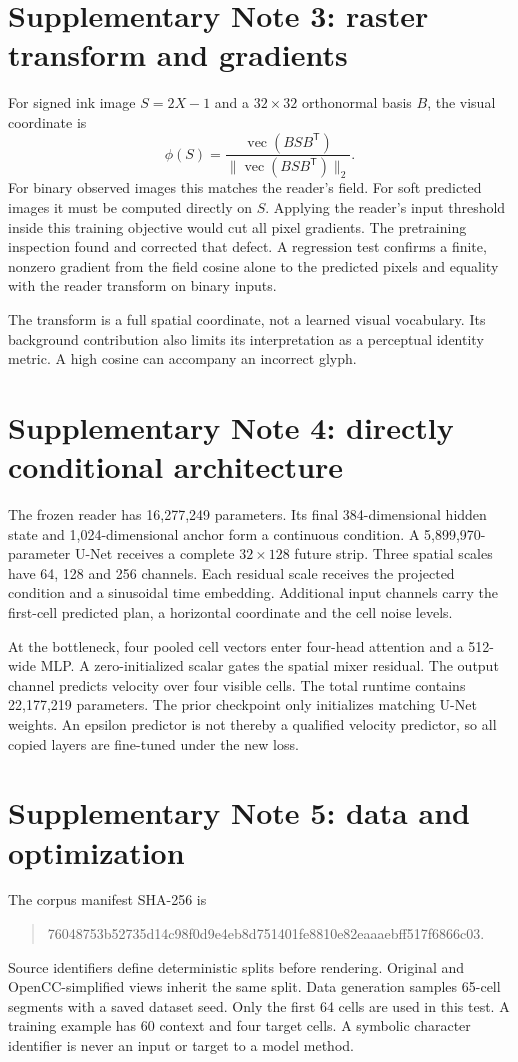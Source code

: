 \documentclass[10pt,a4paper]{article}
\begin{document}
\section*{Supplementary Note 3: raster transform and gradients}
For signed ink image $S=2X-1$ and a $32\times32$ orthonormal basis $B$, the
visual coordinate is
\begin{equation}
\phi(S)=\frac{\operatorname{vec}(BSB^{\mathsf T})}
{\|\operatorname{vec}(BSB^{\mathsf T})\|_2}.
\end{equation}
For binary observed images this matches the reader's field. For soft predicted
images it must be computed directly on $S$. Applying the reader's input
threshold inside this training objective would cut all pixel gradients.
The pretraining inspection found and corrected that defect. A regression test
confirms a finite, nonzero gradient from the field cosine alone to the predicted
pixels and equality with the reader transform on binary inputs.

The transform is a full spatial coordinate, not a learned visual vocabulary.
Its background contribution also limits its interpretation as a perceptual
identity metric. A high cosine can accompany an incorrect glyph.

\section*{Supplementary Note 4: directly conditional architecture}
The frozen reader has 16,277,249 parameters. Its final 384-dimensional hidden
state and 1,024-dimensional anchor form a continuous condition. A 5,899,970-
parameter U-Net receives a complete $32\times128$ future strip. Three spatial
scales have 64, 128 and 256 channels. Each residual scale receives the projected
condition and a sinusoidal time embedding. Additional input channels carry the
first-cell predicted plan, a horizontal coordinate and the cell noise levels.

At the bottleneck, four pooled cell vectors enter four-head attention and a
512-wide MLP. A zero-initialized scalar gates the spatial mixer residual.
The output channel predicts velocity over four visible cells. The total
runtime contains 22,177,219 parameters. The prior checkpoint only initializes
matching U-Net weights. An epsilon predictor is not thereby a qualified
velocity predictor, so all copied layers are fine-tuned under the new loss.

\section*{Supplementary Note 5: data and optimization}
The corpus manifest SHA-256 is
\begin{quote}\small\ttfamily
76048753b52735d14c98f0d9e4eb8d751401fe8810e82eaaaebff517f6866c03.
\end{quote}
Source identifiers define deterministic splits before rendering. Original and
OpenCC-simplified views inherit the same split. Data generation samples
65-cell segments with a saved dataset seed. Only the first 64 cells are used
in this test. A training example has 60 context and four target cells. A
symbolic character identifier is never an input or target to a model method.
\end{document}
